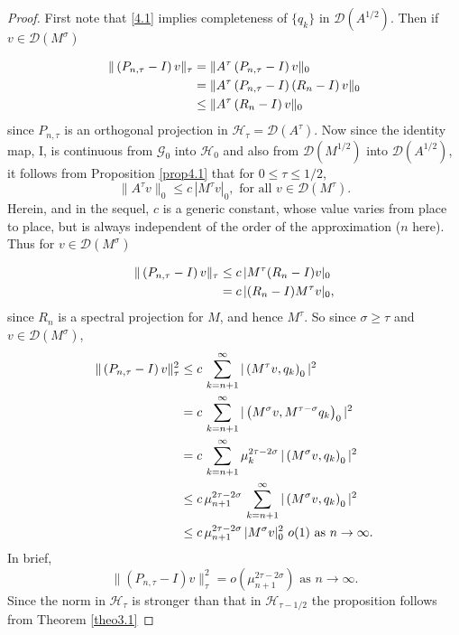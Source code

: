 \documentclass[final]{siamltex}
\numberwithin{equation}{section}
\begin{document}
\begin{proof}
First note that \eqref{4.1} implies completeness of $\{q_k\}$ in $\mathcal{D}(A^{1/2})$. Then if $v\in\mathcal{D}(M^{\sigma})$

\begin{align}
\|\left(P_{n, \tau}- I\right) v\|_{\tau} & = \| A^{\tau}
\left(P_{n, \tau}- I\right) v\|_{0} \notag \\
& = \|  A^{\tau} \left(P_{n, \tau}- I\right) \left(R_n-I\right)
v\|_{0} \notag \\
& \le  \|  A^{\tau} \left(R_n- I\right) v\|_{0} \notag
\end{align}
since $P_{n, \tau}$ is an orthogonal projection in $\mathcal{H}_{\tau}= \mathcal{D}(A^{\tau})$. Now since the identity map, I, is continuous from $\mathcal{G}_0$ into $\mathcal{H}_0$ and also from $\mathcal{D}(M^{1/2})$
into $\mathcal{D}(A^{1/2})$, it follows from Proposition \ref{prop4.1}
that for $0\le \tau \le 1/2$,
\[\|A^{\tau} v\|_0 \le c \, |M^{\tau} v|_0, \text{ for all } v \in \mathcal{D}(M^{\tau}).\]
Herein, and in the sequel, $c$ is a generic constant, whose value varies from place to place, but is always independent of the order of the approximation ($n$ here).
Thus for $v \in \mathcal{D}(M^{\sigma})$

\begin{align}
\|\left(P_{n, \tau}- I\right) v\|_{\tau} & \le  c \,
|M^{\tau} (R_n-I) v|_0 \notag \\
&=c \, |(R_n -I)M^{\tau} v|_0,\notag
\end{align}
since $R_n$ is a spectral projection for $M$, and hence $M^{\tau}$. So since $\sigma\ge \tau$ and $v \in \mathcal{D}(M^{\sigma})$,
\begin{align}
\|\left(P_{n, \tau}- I\right) v\|_{\tau}^2 & \le  c
\, \sum_{k=n+1}^{\infty} |\left( M^{\tau} v, q_k \right)_0|^2 \notag \\
& =   c \, \sum_{k=n+1}^{\infty} |\left( M^{\sigma}
v, M^{\tau-\sigma} q_k \right)_0|^2 \notag \\
& =   c \, \sum_{k=n+1}^{\infty} \mu_k^{2 \tau -2
\sigma} \, |\left( M^{\sigma} v, q_k \right)_0|^2 \notag
\\
& \le  c \, \mu_{n+1}^{2 \tau -2 \sigma} \,
\sum_{k=n+1}^{\infty} |\left( M^{\sigma} v, q_k \right)_0|^2 \notag \\
& \le c \, \mu_{n+1}^{2 \tau -2 \sigma} \, |M^{\sigma} v|_0^2 \, \, o(1) \text{ as } n \to
\infty. \notag
\end{align}
In brief,
\[\|(P_{n,\tau} -I) v\|_{\tau}^2 = o\left(\mu_{n+1}^{2\tau-2 \sigma}\right)
\text{ as } n\to \infty.\]
Since the norm in $\mathcal{H}_{\tau}$ is stronger than that in
$\mathcal{H}_{\tau-1/2}$ the proposition follows from Theorem \ref{theo3.1}
\hfill \end{proof}
\end{document}
